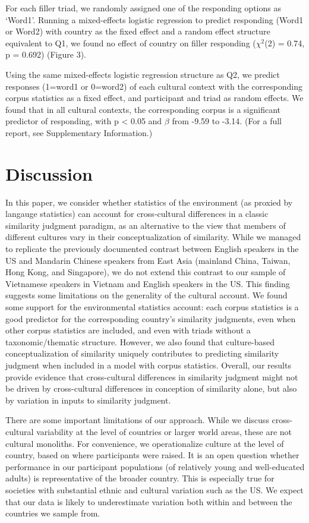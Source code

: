 \documentclass[10pt, letterpaper]{article}
\begin{document}
For each filler triad, we randomly assigned one of the responding
options as `Word1'. Running a mixed-effects logistic regression to
predict responding (Word1 or Word2) with country as the fixed effect and
a random effect structure equivalent to Q1, we found no effect of
country on filler responding (\(\chi^2\)(2) = 0.74, p = 0.692) (Figure
3).

Using the same mixed-effects logistic regression structure as Q2, we
predict responses (1=word1 or 0=word2) of each cultural context with the
corresponding corpus statistics as a fixed effect, and participant and
triad as random effects. We found that in all cultural contexts, the
corresponding corpus is a significant predictor of responding, with p
\textless{} 0.05 and \(\beta\) from -9.59 to -3.14. (For a full report,
see Supplementary Information.)

\hypertarget{discussion}{%
\section{Discussion}\label{discussion}}

In this paper, we consider whether statistics of the environment (as
proxied by langauge statistics) can account for cross-cultural
differences in a classic similarity judgment paradigm, as an alternative
to the view that members of different cultures vary in their
conceptualization of similarity. While we managed to replicate the
previously documented contrast between English speakers in the US and
Mandarin Chinese speakers from East Asia (mainland China, Taiwan, Hong
Kong, and Singapore), we do not extend this contrast to our sample of
Vietnamese speakers in Vietnam and English speakers in the US. This
finding suggests some limitations on the generality of the cultural
account. We found some support for the environmental statistics account:
each corpus statistics is a good predictor for the corresponding
country's similarity judgments, even when other corpus statistics are
included, and even with triads without a taxonomic/thematic structure.
However, we also found that culture-based conceptualization of
similarity uniquely contributes to predicting similarity judgment when
included in a model with corpus statistics. Overall, our results provide
evidence that cross-cultural differences in similarity judgment might
not be driven by cross-cultural differences in conception of similarity
alone, but also by variation in inputs to similarity judgment.

There are some important limitations of our approach. While we discuss
cross-cultural variability at the level of countries or larger world
areas, these are not cultural monoliths. For convenience, we
operationalize culture at the level of country, based on where
participants were raised. It is an open question whether performance in
our participant populations (of relatively young and well-educated
adults) is representative of the broader country. This is especially
true for societies with substantial ethnic and cultural variation such
as the US. We expect that our data is likely to underestimate variation
both within and between the countries we sample from.
\end{document}
